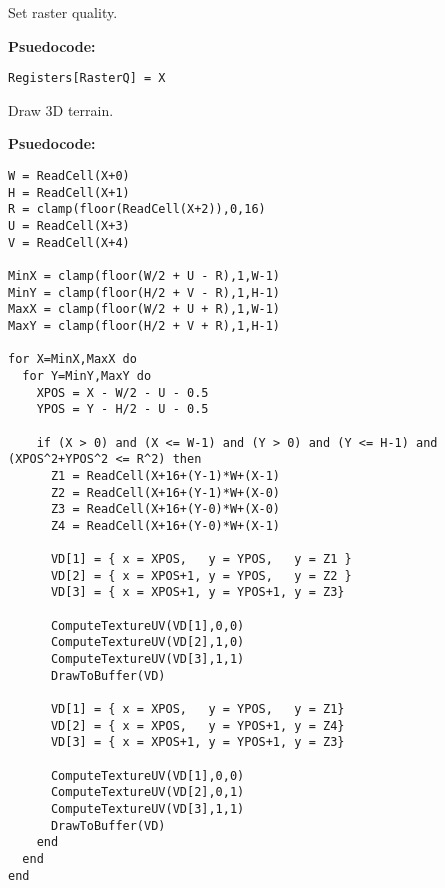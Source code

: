 


%


Set raster quality.

\textbf{Psuedocode:}
\begin{verbatim}
Registers[RasterQ] = X
\end{verbatim}


Draw 3D terrain.

\textbf{Psuedocode:}
\begin{verbatim}
W = ReadCell(X+0)
H = ReadCell(X+1)
R = clamp(floor(ReadCell(X+2)),0,16)
U = ReadCell(X+3)
V = ReadCell(X+4)

MinX = clamp(floor(W/2 + U - R),1,W-1)
MinY = clamp(floor(H/2 + V - R),1,H-1)
MaxX = clamp(floor(W/2 + U + R),1,W-1)
MaxY = clamp(floor(H/2 + V + R),1,H-1)

for X=MinX,MaxX do
  for Y=MinY,MaxY do
    XPOS = X - W/2 - U - 0.5
    YPOS = Y - H/2 - U - 0.5

    if (X > 0) and (X <= W-1) and (Y > 0) and (Y <= H-1) and (XPOS^2+YPOS^2 <= R^2) then
      Z1 = ReadCell(X+16+(Y-1)*W+(X-1)
      Z2 = ReadCell(X+16+(Y-1)*W+(X-0)
      Z3 = ReadCell(X+16+(Y-0)*W+(X-0)
      Z4 = ReadCell(X+16+(Y-0)*W+(X-1)
      
      VD[1] = { x = XPOS,   y = YPOS,   y = Z1 }
      VD[2] = { x = XPOS+1, y = YPOS,   y = Z2 }
      VD[3] = { x = XPOS+1, y = YPOS+1, y = Z3}

      ComputeTextureUV(VD[1],0,0)
      ComputeTextureUV(VD[2],1,0)
      ComputeTextureUV(VD[3],1,1)
      DrawToBuffer(VD)
        
      VD[1] = { x = XPOS,   y = YPOS,   y = Z1}
      VD[2] = { x = XPOS,   y = YPOS+1, y = Z4}
      VD[3] = { x = XPOS+1, y = YPOS+1, y = Z3}

      ComputeTextureUV(VD[1],0,0)
      ComputeTextureUV(VD[2],0,1)
      ComputeTextureUV(VD[3],1,1)
      DrawToBuffer(VD)
    end
  end
end
\end{verbatim}





